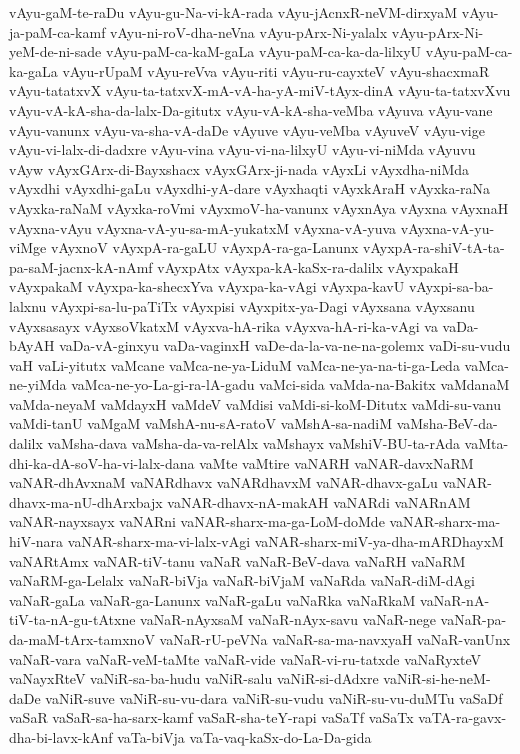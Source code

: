 {vAyu-gaM-te-raDu
vAyu-gu-Na-vi-kA-rada
vAyu-jAcnxR-neVM-dirxyaM
vAyu-ja-paM-ca-kamf
vAyu-ni-roV-dha-neVna
vAyu-pArx-Ni-yalalx
vAyu-pArx-Ni-yeM-de-ni-sade
vAyu-paM-ca-kaM-gaLa
vAyu-paM-ca-ka-da-lilxyU
vAyu-paM-ca-ka-gaLa
vAyu-rUpaM
vAyu-reVva
vAyu-riti
vAyu-ru-cayxteV
vAyu-shacxmaR
vAyu-tatatxvX
vAyu-ta-tatxvX-mA-vA-ha-yA-miV-tAyx-dinA
vAyu-ta-tatxvXvu
vAyu-vA-kA-sha-da-lalx-Da-gitutx
vAyu-vA-kA-sha-veMba
vAyuva
vAyu-vane
vAyu-vanunx
vAyu-va-sha-vA-daDe
vAyuve
vAyu-veMba
vAyuveV
vAyu-vige
vAyu-vi-lalx-di-dadxre
vAyu-vina
vAyu-vi-na-lilxyU
vAyu-vi-niMda
vAyuvu
vAyw
vAyxGArx-di-Bayxshacx
vAyxGArx-ji-nada
vAyxLi
vAyxdha-niMda
vAyxdhi
vAyxdhi-gaLu
vAyxdhi-yA-dare
vAyxhaqti
vAyxkAraH
vAyxka-raNa
vAyxka-raNaM
vAyxka-roVmi
vAyxmoV-ha-vanunx
vAyxnAya
vAyxna
vAyxnaH
vAyxna-vAyu
vAyxna-vA-yu-sa-mA-yukatxM
vAyxna-vA-yuva
vAyxna-vA-yu-viMge
vAyxnoV
vAyxpA-ra-gaLU
vAyxpA-ra-ga-Lanunx
vAyxpA-ra-shiV-tA-ta-pa-saM-jacnx-kA-nAmf
vAyxpAtx
vAyxpa-kA-kaSx-ra-dalilx
vAyxpakaH
vAyxpakaM
vAyxpa-ka-shecxYva
vAyxpa-ka-vAgi
vAyxpa-kavU
vAyxpi-sa-ba-lalxnu
vAyxpi-sa-lu-paTiTx
vAyxpisi
vAyxpitx-ya-Dagi
vAyxsana
vAyxsanu
vAyxsasayx
vAyxsoVkatxM
vAyxva-hA-rika
vAyxva-hA-ri-ka-vAgi
va
vaDa-bAyAH
vaDa-vA-ginxyu
vaDa-vaginxH
vaDe-da-la-va-ne-na-golemx
vaDi-su-vudu
vaH
vaLi-yitutx
vaMcane
vaMca-ne-ya-LiduM
vaMca-ne-ya-na-ti-ga-Leda
vaMca-ne-yiMda
vaMca-ne-yo-La-gi-ra-lA-gadu
vaMci-sida
vaMda-na-Bakitx
vaMdanaM
vaMda-neyaM
vaMdayxH
vaMdeV
vaMdisi
vaMdi-si-koM-Ditutx
vaMdi-su-vanu
vaMdi-tanU
vaMgaM
vaMshA-nu-sA-ratoV
vaMshA-sa-nadiM
vaMsha-BeV-da-dalilx
vaMsha-dava
vaMsha-da-va-relAlx
vaMshayx
vaMshiV-BU-ta-rAda
vaMta-dhi-ka-dA-soV-ha-vi-lalx-dana
vaMte
vaMtire
vaNARH
vaNAR-davxNaRM
vaNAR-dhAvxnaM
vaNARdhavx
vaNARdhavxM
vaNAR-dhavx-gaLu
vaNAR-dhavx-ma-nU-dhArxbajx
vaNAR-dhavx-nA-makAH
vaNARdi
vaNARnAM
vaNAR-nayxsayx
vaNARni
vaNAR-sharx-ma-ga-LoM-doMde
vaNAR-sharx-ma-hiV-nara
vaNAR-sharx-ma-vi-lalx-vAgi
vaNAR-sharx-miV-ya-dha-mARDhayxM
vaNARtAmx
vaNAR-tiV-tanu
vaNaR
vaNaR-BeV-dava
vaNaRH
vaNaRM
vaNaRM-ga-Lelalx
vaNaR-biVja
vaNaR-biVjaM
vaNaRda
vaNaR-diM-dAgi
vaNaR-gaLa
vaNaR-ga-Lanunx
vaNaR-gaLu
vaNaRka
vaNaRkaM
vaNaR-nA-tiV-ta-nA-gu-tAtxne
vaNaR-nAyxsaM
vaNaR-nAyx-savu
vaNaR-nege
vaNaR-pa-da-maM-tArx-tamxnoV
vaNaR-rU-peVNa
vaNaR-sa-ma-navxyaH
vaNaR-vanUnx
vaNaR-vara
vaNaR-veM-taMte
vaNaR-vide
vaNaR-vi-ru-tatxde
vaNaRyxteV
vaNayxRteV
vaNiR-sa-ba-hudu
vaNiR-salu
vaNiR-si-dAdxre
vaNiR-si-he-neM-daDe
vaNiR-suve
vaNiR-su-vu-dara
vaNiR-su-vudu
vaNiR-su-vu-duMTu
vaSaDf
vaSaR
vaSaR-sa-ha-sarx-kamf
vaSaR-sha-teY-rapi
vaSaTf
vaSaTx
vaTA-ra-gavx-dha-bi-lavx-kAnf
vaTa-biVja
vaTa-vaq-kaSx-do-La-Da-gida
}
